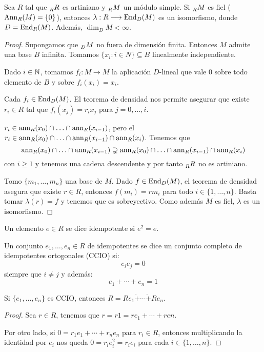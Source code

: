 \begin{prop}
  Sea \(R\) tal que \(\prescript{}{R}{R}\) es artiniano y
  \(\prescript{}{R}{M}\) un módulo simple. Si \(\prescript{}{R}{M}\)
  es fiel (\(\operatorname{Ann}_R(M)=\{0\}\)),
  entonces \(\lambda:R\longrightarrow\operatorname{End}_D(M)\) es un isomorfismo, donde
  \(D=\operatorname{End}_R(M)\).
  Además, \(\dim_D M<\infty\).
\end{prop}
\begin{proof}
  Supongamos que \(\prescript{}{D}{M}\) no fuera de dimensión finita.
  Entonces \(M\) admite una base \(B\) infinita. Tomamos \(\{x_i:i\in N\}
  \subseteq B\) linealmente independiente.

  Dado \(i\in \mathbb{N}\), tomamos \(f_i:M\longrightarrow M\) la aplicación
  \(D\)-lineal que vale 0 sobre todo elemento de \(B\) y sobre
  \(f_i(x_i)=x_i\).

  Cada \(f_i\in\operatorname{End}_D(M)\). El teorema de densidad nos permite asegurar
  que existe \(r_i\in R\) tal que \(f_i(x_j)=r_i x_j\) para
  \(j=0,\ldots, i\).

  \(r_i\in\operatorname{ann}_R(x_0)\cap\ldots\cap\operatorname{ann}_R(x_{i-1})\), pero el
  \(r_i\in\operatorname{ann}_R(x_0)\cap\ldots\cap\operatorname{ann}_R(x_{i-1})\cap\operatorname{ann}_R(x_i)\).
  Tenemos que \[\operatorname{ann}_R(x_0)\cap\ldots\cap\operatorname{ann}_R(x_{i-1})
  \supsetneq\operatorname{ann}_R(x_0)\cap\ldots\cap\operatorname{ann}_R(x_{i-1})\cap\operatorname{ann}_R(x_i)\]
  con \(i\ge 1\) y tenemos una cadena descendente y por tanto
  \(\prescript{}{R}{R}\) no es artiniano.

  Tomo \(\{m_1,\ldots,m_n\}\) una base de \(M\). Dado \(f\in\operatorname{End}_D(M)\),
  el teorema de densidad asegura que existe \(r\in R\), entonces
  \(f(m_i)=rm_i\) para todo \(i\in\{1,\ldots,n\}\). Basta tomar
  \(\lambda(r)=f\) y tenemos que es sobreyectivo. Como además \(M\)
  es fiel, \(\lambda\) es un isomorfismo.

\end{proof}

\begin{df}[Idempotentes]
  Un elemento \(e\in R\) se dice idempotente si \(e^2=e\).

  Un conjunto \(e_1,\ldots,e_n\in R\) de idempotentes se dice un conjunto
  completo de idempotentes ortogonales (CCIO) si:
  \[
    e_i e_j=0
  \] siempre que \(i\neq j\) y además:
  \[
    e_1+\cdots+e_n = 1
  \]
\end{df}
\begin{prop}
  Si \(\{e_1,\ldots,e_n\}\) es CCIO, entonces
  \(R=Re_1\dot{+}\cdots\dot{+}Re_n\).
\end{prop}
\begin{proof}
  Sea \(r\in R\), tenemos que \(r=r1=re_1+\cdots+ren\).

  Por otro lado, si \(0=r_1 e_1+\cdots+r_n e_n\) para \(r_i\in R\),
  entonces multiplicando la identidad por \(e_i\) nos queda
  \(0=r_i e_i^2=r_i e_i\) para cada \(i\in\{1,\ldots,n\}\).

\end{proof}

